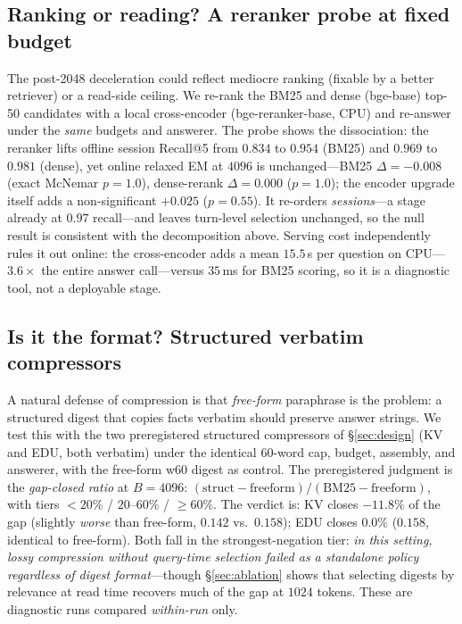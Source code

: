 \documentclass{article} %
\begin{document}
\subsection{Ranking or reading? A reranker probe at fixed budget}
\label{sec:rerank}
The post-2048 deceleration could reflect mediocre ranking (fixable by a better retriever)
or a read-side ceiling. We re-rank the BM25 and dense (bge-base) top-50 candidates with a
local cross-encoder (bge-reranker-base, CPU) and re-answer under the \emph{same} budgets
and answerer. The probe shows the dissociation: the reranker lifts offline
session Recall@5 from $0.834$ to $0.954$ (BM25) and $0.969$ to $0.981$ (dense), yet online
relaxed EM at $4096$ is unchanged---BM25 $\Delta{=}-0.008$ (exact McNemar $p{=}1.0$),
dense-rerank $\Delta{=}0.000$ ($p{=}1.0$); the encoder upgrade itself adds a
non-significant $+0.025$ ($p{=}0.55$). It re-orders \emph{sessions}---a stage already at
$0.97$ recall---and leaves turn-level selection unchanged, so the null result is consistent
with the decomposition above. Serving cost independently rules it out
online: the cross-encoder adds a mean $15.5$\,s per question on CPU---$3.6\times$ the
entire answer call---versus $35$\,ms for BM25 scoring, so it is a diagnostic tool, not a
deployable stage.


\subsection{Is it the format? Structured verbatim compressors}
\label{sec:struct}
A natural defense of compression is that \emph{free-form} paraphrase is the problem: a
structured digest that copies facts verbatim should preserve answer strings. We test this
with the two preregistered structured compressors of \S\ref{sec:design} (KV and EDU, both
verbatim) under the identical 60-word cap, budget, assembly, and answerer, with the
free-form w60 digest as control. The preregistered judgment is the \emph{gap-closed ratio}
at $B{=}4096$: $(\text{struct}-\text{freeform})/(\text{BM25}-\text{freeform})$, with tiers
$<20\%$ / $20$--$60\%$ / $\geq 60\%$. The verdict is: KV closes
$-11.8\%$ of the gap (slightly \emph{worse} than free-form, $0.142$ vs.\ $0.158$); EDU
closes $0.0\%$ ($0.158$, identical to free-form). Both fall in the strongest-negation
tier: \emph{in this setting, lossy compression without query-time selection failed as a
standalone policy regardless of digest format}---though \S\ref{sec:ablation} shows that
selecting digests by relevance at read time recovers much of the gap at $1024$ tokens. These are diagnostic runs compared \emph{within-run} only.
\end{document}

